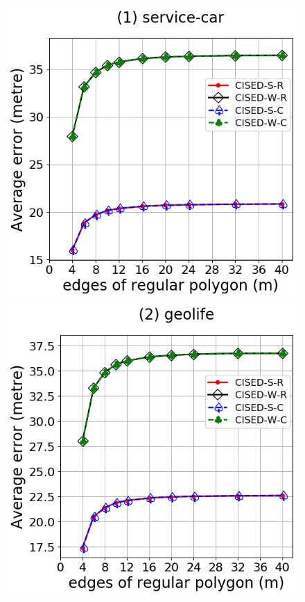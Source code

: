 {\begin{figure}[tb!]
	\centering
	\includegraphics[scale = 0.2900]{Figures/Exp-M-e-60-error-service.png}\hspace{1ex}
	\includegraphics[scale = 0.2900]{Figures/Exp-M-e-60-error-geolife.png}\hspace{1ex}

\end{figure}}
